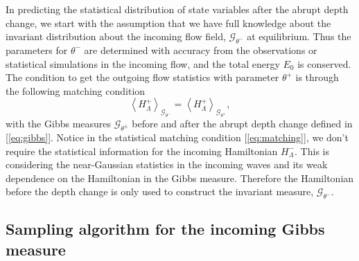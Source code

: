 \documentclass[9pt,twoside,lineno]{pnas-new}
\theoremstyle{plain}
\theoremstyle{plain}
\begin{document}
In predicting the statistical distribution of state variables after the abrupt depth change, we
start with the assumption that we have full knowledge about the
invariant distribution about the incoming flow field, $\mathcal{G}_{\theta^{-}}$
at equilibrium. Thus the parameters for $\theta^{-}$ are determined
with accuracy from the observations or statistical simulations in
the incoming flow, and the total energy $E_{0}$ is conserved. The
condition to get the outgoing flow statistics with parameter $\theta^{+}$
is through the following matching condition
\begin{equation}
\left\langle H_{\Lambda}^{+}\right\rangle _{\mathcal{G}_{\theta^{-}}}=\left\langle H_{\Lambda}^{+}\right\rangle _{\mathcal{G}_{\theta^{+}}},\label{eq:matching}
\end{equation}
with the Gibbs measures $\mathcal{G}_{\theta^{\pm}}$ before and after
the abrupt depth change defined in [\ref{eq:gibbs}]. Notice in the
statistical matching condition [\ref{eq:matching}], we don't require
the statistical information for the incoming Hamiltonian $H_{\Lambda}^{-}$.
This is considering the near-Gaussian statistics in the incoming waves
and its weak dependence on the Hamiltonian in the Gibbs measure. Therefore
the Hamiltonian before the depth change is only used to construct
the invariant measure, $\mathcal{G}_{\theta^{-}}$.

\subsection{Sampling algorithm for the incoming Gibbs measure}
\end{document}
